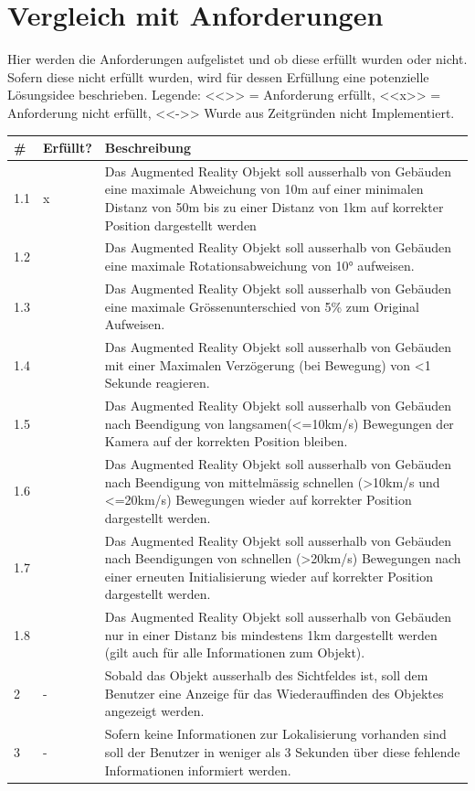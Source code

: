 \documentclass[a4paper]{scrreprt}
\begin{document}
\section{Vergleich mit Anforderungen}
Hier werden die Anforderungen aufgelistet und ob diese erfüllt wurden oder nicht. Sofern diese nicht erfüllt wurden, wird für dessen Erfüllung eine potenzielle Lösungsidee beschrieben.
\bigbreak
Legende:
<<\checkmark >> = Anforderung erfüllt, <<x>> = Anforderung nicht erfüllt, <<->> Wurde aus Zeitgründen nicht Implementiert.

\begin{tabularx}{\textwidth}{l l X}
\hline
	\# & \textbf{Erfüllt?} & \textbf{Beschreibung} \\
\hline
	1.1 & x & Das Augmented Reality Objekt soll ausserhalb von Gebäuden eine maximale Abweichung von 10m auf einer minimalen Distanz von 50m bis zu einer Distanz von 1km auf korrekter Position dargestellt werden \\
\hline
	1.2 & \checkmark & Das Augmented Reality Objekt soll ausserhalb von Gebäuden eine maximale Rotationsabweichung von \ang{10} aufweisen.\\
\hline
	1.3 & \checkmark & Das Augmented Reality Objekt soll ausserhalb von Gebäuden eine maximale Grössenunterschied von 5\% zum Original Aufweisen.\\
\hline
	1.4 & \checkmark & Das Augmented Reality Objekt soll ausserhalb von Gebäuden mit einer Maximalen Verzögerung (bei Bewegung) von <1 Sekunde reagieren.\\
\hline
	1.5 & \checkmark & Das Augmented Reality Objekt soll ausserhalb von Gebäuden nach Beendigung von langsamen(<=10km/s) Bewegungen der Kamera auf der korrekten Position bleiben.\\
\hline
	1.6 & \checkmark & Das Augmented Reality Objekt soll ausserhalb von Gebäuden nach Beendigung von mittelmässig schnellen (>10km/s und <=20km/s) Bewegungen wieder auf korrekter Position dargestellt werden.\\
\hline
	1.7 & \checkmark & Das Augmented Reality Objekt soll ausserhalb von Gebäuden nach Beendigungen von schnellen (>20km/s) Bewegungen nach einer erneuten Initialisierung wieder auf korrekter Position dargestellt werden.\\
\hline
	1.8 & \checkmark & Das Augmented Reality Objekt soll ausserhalb von Gebäuden nur in einer Distanz bis mindestens 1km dargestellt werden (gilt auch für alle Informationen zum Objekt).\\
\hline
	2 & - & Sobald das Objekt ausserhalb des Sichtfeldes ist, soll dem Benutzer eine Anzeige für das Wiederauffinden des Objektes angezeigt werden.\\
\hline
	3 & - & Sofern keine Informationen zur Lokalisierung vorhanden sind soll der Benutzer in weniger als 3 Sekunden über diese fehlende Informationen informiert werden. \\
\hline
\end{tabularx}
\end{document}
